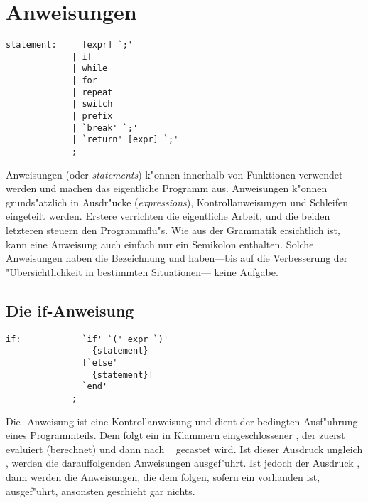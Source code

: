\section{Anweisungen}

\begin{verbatim}
statement:     [expr] `;'
             | if
             | while
             | for
             | repeat
             | switch
             | prefix
             | `break' `;'
             | `return' [expr] `;'
             ;
\end{verbatim}

Anweisungen (oder {\em statements}) k"onnen innerhalb von Funktionen
verwendet werden und machen das eigentliche Programm aus.
Anweisungen k"onnen grunds"atzlich in Ausdr"ucke ({\em expressions}),
Kontrollanweisungen
und Schleifen
eingeteilt werden. Erstere verrichten die
eigentliche Arbeit, und die beiden letzteren steuern den Programmflu"s. Wie
aus der Grammatik ersichtlich ist, kann eine Anweisung auch
einfach nur ein Semikolon enthalten. Solche Anweisungen haben die
Bezeichnung {\em {}} und haben---bis auf die
Verbesserung der "Ubersichtlichkeit in bestimmten Situationen---%
keine Aufgabe.

\subsection{Die if-Anweisung}

\begin{verbatim}
if:            `if' `(' expr `)'
                 {statement}
               [`else'
                 {statement}]
               `end'
             ;
\end{verbatim}

Die -Anweisung ist eine Kontrollanweisung und dient der
bedingten Ausf"uhrung eines Programmteils. Dem 
folgt ein in Klammern eingeschlossener , der zuerst
evaluiert (berechnet) und dann nach \tint\
gecastet wird. Ist dieser
Ausdruck ungleich , werden die darauffolgenden
Anweisungen ausgef"uhrt. Ist jedoch der Ausdruck , dann
werden die Anweisungen, die dem  folgen, sofern ein
\rw{else} vorhanden ist, ausgef"uhrt, ansonsten geschieht gar
nichts.


